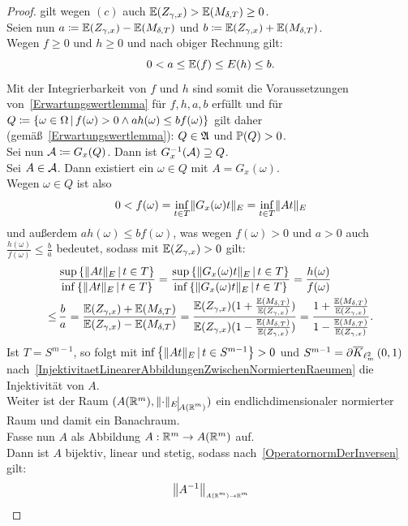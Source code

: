 \begin{proof}
gilt wegen $(c)$ auch $\mathbb{E}(Z_{\gamma,x})>\mathbb{E}(M_{\delta, T}) \ge 0$.\\
Seien nun $a\coloneqq \mathbb{E}(Z_{\gamma,x}) - \mathbb{E}(M_{\delta, T})$ und
$b\coloneqq \mathbb{E}(Z_{\gamma,x}) + \mathbb{E}(M_{\delta, T})$.\\
Wegen $f \ge 0$ und $h \ge 0$ und nach obiger Rechnung gilt:
\[ 0 < a \le \mathbb{E}(f) \le E(h) \le b\text.\]
Mit der Integrierbarkeit von $f$ und $h$ sind somit die Voraussetzungen von~\ref{Erwartungswertlemma} für $f, h, a, b$ erfüllt und für
$Q \coloneqq \left\{\omega \in \Omega\,|\,f(\omega)> 0 \wedge ah(\omega) \le bf(\omega)\right\}$
gilt daher (gemäß~\ref{Erwartungswertlemma}): $Q\in \mathfrak{A}$ und $\mathbb{P}(Q) > 0$.\\
Sei nun $\mathcal{A}\coloneqq G_x(Q)$.
Dann ist $G_x^{-1}(\mathcal{A}) \supseteq Q$.\\
Sei $A \in \mathcal{A}$. Dann existiert ein $\omega \in Q$ mit $A = G_x(\omega)$.\\
Wegen $\omega \in Q$ ist also
\[0 < f(\omega) = \inf_{t \in T}\lVert G_x(\omega)t\rVert_E 
    = \inf_{t \in T}\lVert At\rVert_E \]
und außerdem $ah(\omega) \le bf(\omega)$, was wegen $f(\omega)> 0$ und $a >0$
auch $\frac{h(\omega)}{f(\omega)} \le \frac b a$ bedeutet, sodass mit
$\mathbb{E}(Z_{\gamma, x})>0$ gilt:
\begin{align*}
&\,\frac{\sup\left\{\lVert At\rVert_E\,|\,t \in T\right\}}
       {\inf\left\{\lVert At\rVert_E\,|\,t \in T\right\}}
 =\frac{\sup\left\{\lVert G_x(\omega)t\rVert_E\,|\,t \in T\right\}}
       {\inf\left\{\lVert G_x(\omega)t\rVert_E\,|\,t \in T\right\}}
 = \frac{h(\omega)}{f(\omega)}\\ \le & \,\frac b a = 
 \frac{\mathbb{E}(Z_{\gamma,x})+\mathbb{E}(M_{\delta, T})}{\mathbb{E}(Z_{\gamma,x})-\mathbb{E}(M_{\delta, T})}
 = \frac{\mathbb{E}(Z_{\gamma,x})(1 + \frac{\mathbb{E}(M_{\delta, T})}{\mathbb{E}(Z_{\gamma,x})})}
        {\mathbb{E}(Z_{\gamma,x})(1 - \frac{\mathbb{E}(M_{\delta, T})}{\mathbb{E}(Z_{\gamma,x})})}
 = \frac{1 + \frac{\mathbb{E}(M_{\delta, T})}{\mathbb{E}(Z_{\gamma,x})}}
        {1 - \frac{\mathbb{E}(M_{\delta, T})}{\mathbb{E}(Z_{\gamma,x})}}\text.
 \end{align*}
Ist $T = S^{m-1}$, so folgt mit $\inf\left\{\lVert At\rVert_E\,|\,t \in S^{m-1}\right\} > 0$
und $S^{m-1} = \partial \overline K_{\ell^2_m}\left(0, 1\right)$ nach~\ref{InjektivitaetLinearerAbbildungenZwischenNormiertenRaeumen} die Injektivität
von $A$.\\
Weiter ist der Raum 
$(A(\R^m), \restrict{\norm\cdot_E}{A(\R^m)})$ ein endlichdimensionaler
normierter Raum und damit ein Banachraum.\\
Fasse nun $A$ als Abbildung $A:\mathbb{R}^m \rightarrow A(\mathbb{R}^m)$ auf.\\
Dann ist $A$ bijektiv, linear und stetig, sodass nach~\ref{OperatornormDerInversen} gilt:
\[\left\|A^{-1}\right\|_{\scriptscriptstyle{A(\ensuremath{\mathbb{R}}^m) \rightarrow \ensuremath{\mathbb{R}}^m}} 
\]
\end{proof}
